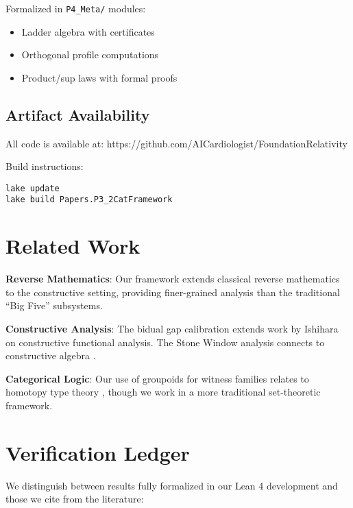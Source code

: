 \documentclass[11pt]{article}
\begin{document}
Formalized in \texttt{P4\_Meta/} modules:
\begin{itemize}
\item Ladder algebra with certificates
\item Orthogonal profile computations
\item Product/sup laws with formal proofs
\end{itemize}

\subsection{Artifact Availability}

All code is available at: https://github.com/AICardiologist/FoundationRelativity

Build instructions:
\begin{verbatim}
lake update
lake build Papers.P3_2CatFramework
\end{verbatim}

\section{Related Work}

\textbf{Reverse Mathematics}: Our framework extends classical reverse mathematics \cite{Simpson} to the constructive setting, providing finer-grained analysis than the traditional ``Big Five'' subsystems.

\textbf{Constructive Analysis}: The bidual gap calibration extends work by Ishihara \cite{Ishihara} on constructive functional analysis. The Stone Window analysis connects to constructive algebra \cite{Mines}.

\textbf{Categorical Logic}: Our use of groupoids for witness families relates to homotopy type theory \cite{HoTT}, though we work in a more traditional set-theoretic framework.

\appendix
\section{Verification Ledger}\label{app:verification}

We distinguish between results fully formalized in our Lean 4 development and those we cite from the literature:
\end{document}
